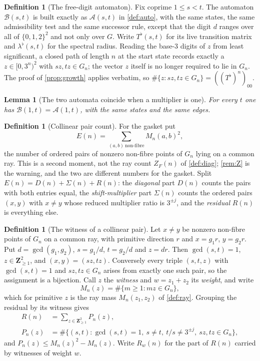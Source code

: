 \documentclass[11pt]{amsart}
\newtheorem{lemma}[theorem]{Lemma}
\theoremstyle{definition}
\newtheorem{definition}[theorem]{Definition}
\theoremstyle{remark}
\begin{document}
\begin{definition}[The free-digit automaton]
\label{def:free}
Fix coprime $1\le s<t$. The automaton $\mathcal{B}(s,t)$ is built exactly as $\mathcal{A}(s,t)$ in \cref{def:auto}, with the same states, the same admissibility test and the same successor rule, except that the digit $d$ ranges over all of $\{0,1,2\}^2$ and not only over $G$. Write $T^\flat(s,t)$ for its live transition matrix and $\lambda^\flat(s,t)$ for the spectral radius. Reading the base-$3$ digits of $z$ from least significant, a closed path of length $n$ at the start state records exactly a $z\in[0,3^n)^2$ with $sz,tz\in G_n$; the vector $z$ itself is no longer required to lie in $G_n$. The proof of \cref{prop:growth} applies verbatim, so $\#\{z: sz,tz\in G_n\}=((T^\flat)^n)_{00}$.
\end{definition}

\begin{lemma}[The two automata coincide when a multiplier is one]
\label{lem:free}
For every $t$ one has $\mathcal{B}(1,t)=\mathcal{A}(1,t)$, with the same states and the same edges.
\end{lemma}

\begin{definition}[Collinear pair count]
\label{def:pairs}
For the gasket put
\[
E(n)=\sum_{(a,b)\ \mathrm{non\text{-}fibre}} M_n(a,b)^2 ,
\]
the number of ordered pairs of nonzero non-fibre points of $G_n$ lying on a common ray. This is a second moment, not the ray count $Z_F(n)$ of \cref{def:diag}; \cref{rem:Z} is the warning, and the two are different numbers for the gasket. Split $E(n)=D(n)+\Sigma(n)+R(n)$: the \emph{diagonal} part $D(n)$ counts the pairs with both entries equal, the \emph{shift-multiplier} part $\Sigma(n)$ counts the ordered pairs $(x,y)$ with $x\neq y$ whose reduced multiplier ratio is $3^{\pm j}$, and the \emph{residual} $R(n)$ is everything else.
\end{definition}

\begin{definition}[The witness of a collinear pair]
\label{def:witness}
Let $x\neq y$ be nonzero non-fibre points of $G_n$ on a common ray, with primitive direction $r$ and $x=g_1r$, $y=g_2r$. Put $d=\gcd(g_1,g_2)$, $s=g_1/d$, $t=g_2/d$ and $z=dr$. Then $\gcd(s,t)=1$, $z\in\mathbf{Z}_{\ge 1}^2$, and $(x,y)=(sz,tz)$. Conversely every triple $(s,t,z)$ with $\gcd(s,t)=1$ and $sz,tz\in G_n$ arises from exactly one such pair, so the assignment is a bijection. Call $z$ the \emph{witness} and $w=z_1+z_2$ its \emph{weight}, and write
\[
M_n(z)=\#\{m\ge 1: mz\in G_n\},
\]
which for primitive $z$ is the ray mass $M_n(z_1,z_2)$ of \cref{def:ray}. Grouping the residual by its witness gives
\[
\begin{aligned}
R(n)&=\sum_{z\in\mathbf{Z}_{\ge 1}^2}P_n(z),\\
P_n(z)&=\#\{(s,t):\gcd(s,t)=1,\ s\neq t,\ t/s\neq 3^{\pm j},\ sz,tz\in G_n\},
\end{aligned}
\]
and $P_n(z)\le M_n(z)^2-M_n(z)$. Write $R_w(n)$ for the part of $R(n)$ carried by witnesses of weight $w$.
\end{definition}
\end{document}
